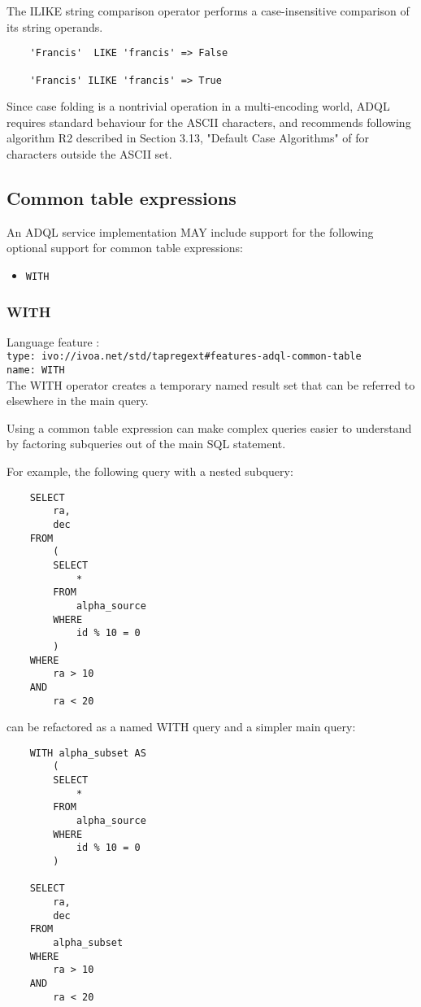 \documentclass[11pt,a4paper]{ivoa}
\begin{document}
The ILIKE string comparison operator performs a case-insensitive comparison
of its string operands.

\begin{verbatim}
    'Francis'  LIKE 'francis' => False

    'Francis' ILIKE 'francis' => True
\end{verbatim}

Since case folding is a nontrivial operation in a multi-encoding world,
ADQL requires standard behaviour for the ASCII characters, and recommends
following algorithm R2 described in Section 3.13, "Default Case Algorithms"
of \citet{std:UNICODE} for characters outside the ASCII set.

\subsection{Common table expressions}
\label{sec:common-table}

An ADQL service implementation MAY include support for the following optional
support for common table expressions:

\begin{itemize}
    \item \verb:WITH:
\end{itemize}

\subsubsection{WITH}
{\footnotesize Language feature :}\\
{\footnotesize \verb|type: ivo://ivoa.net/std/tapregext#features-adql-common-table|}\\
{\footnotesize \verb|name: WITH|}\\

The WITH operator creates a temporary named result set that can be referred
to elsewhere in the main query.

Using a common table expression can make complex queries easier to understand
by factoring subqueries out of the main SQL statement.

For example, the following query with a nested subquery:
\begin{verbatim}
    SELECT
        ra,
        dec
    FROM
        (
        SELECT
            *
        FROM
            alpha_source
        WHERE
            id % 10 = 0
        )
    WHERE
        ra > 10
    AND
        ra < 20
\end{verbatim}
\noindent
can be refactored as a named WITH query and a simpler main query:
\begin{verbatim}
    WITH alpha_subset AS
        (
        SELECT
            *
        FROM
            alpha_source
        WHERE
            id % 10 = 0
        )

    SELECT
        ra,
        dec
    FROM
        alpha_subset
    WHERE
        ra > 10
    AND
        ra < 20
\end{verbatim}
\end{document}
